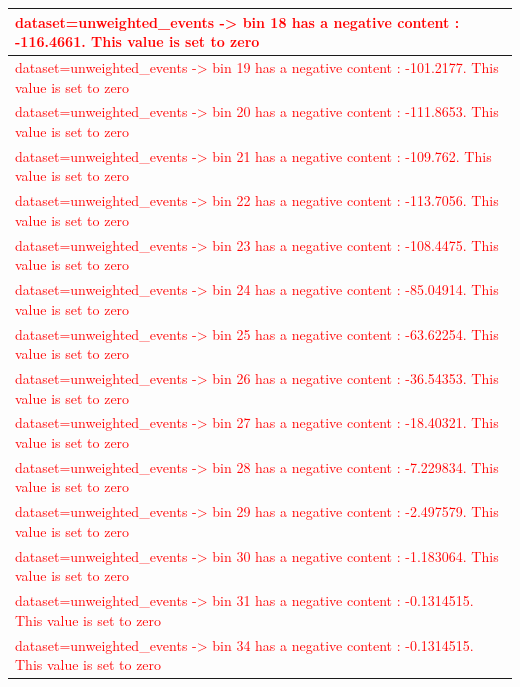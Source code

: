 \documentclass[a4paper, 10pt]{article}
\begin{document}
\begin{table}[H]
\begin{center}
\begin{tabular}{|m{140.0mm}|}
      \hline
      {\cellcolor{white}\textcolor{red}{dataset=unweighted\_events -> bin 18 has a negative content : -116.4661. This value is set to zero}}\\
      \hline
      {\cellcolor{white}\textcolor{red}{dataset=unweighted\_events -> bin 19 has a negative content : -101.2177. This value is set to zero}}\\
      \hline
      {\cellcolor{white}\textcolor{red}{dataset=unweighted\_events -> bin 20 has a negative content : -111.8653. This value is set to zero}}\\
      \hline
      {\cellcolor{white}\textcolor{red}{dataset=unweighted\_events -> bin 21 has a negative content : -109.762. This value is set to zero}}\\
      \hline
      {\cellcolor{white}\textcolor{red}{dataset=unweighted\_events -> bin 22 has a negative content : -113.7056. This value is set to zero}}\\
      \hline
      {\cellcolor{white}\textcolor{red}{dataset=unweighted\_events -> bin 23 has a negative content : -108.4475. This value is set to zero}}\\
      \hline
      {\cellcolor{white}\textcolor{red}{dataset=unweighted\_events -> bin 24 has a negative content : -85.04914. This value is set to zero}}\\
      \hline
      {\cellcolor{white}\textcolor{red}{dataset=unweighted\_events -> bin 25 has a negative content : -63.62254. This value is set to zero}}\\
      \hline
      {\cellcolor{white}\textcolor{red}{dataset=unweighted\_events -> bin 26 has a negative content : -36.54353. This value is set to zero}}\\
      \hline
      {\cellcolor{white}\textcolor{red}{dataset=unweighted\_events -> bin 27 has a negative content : -18.40321. This value is set to zero}}\\
      \hline
      {\cellcolor{white}\textcolor{red}{dataset=unweighted\_events -> bin 28 has a negative content : -7.229834. This value is set to zero}}\\
      \hline
      {\cellcolor{white}\textcolor{red}{dataset=unweighted\_events -> bin 29 has a negative content : -2.497579. This value is set to zero}}\\
      \hline
      {\cellcolor{white}\textcolor{red}{dataset=unweighted\_events -> bin 30 has a negative content : -1.183064. This value is set to zero}}\\
      \hline
      {\cellcolor{white}\textcolor{red}{dataset=unweighted\_events -> bin 31 has a negative content : -0.1314515. This value is set to zero}}\\
      \hline
      {\cellcolor{white}\textcolor{red}{dataset=unweighted\_events -> bin 34 has a negative content : -0.1314515. This value is set to zero}}\\
      \hline
\hline
    \end{tabular}
  \end{center}
\end{table}
\end{document}
